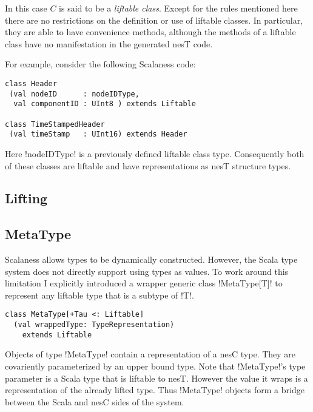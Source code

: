In this case $C$ is said to be a \textit{liftable class}. Except for the rules mentioned here
there are no restrictions on the definition or use of liftable classes. In particular, they are
able to have convenience methods, although the methods of a liftable class have no manifestation
in the generated nesT code.

For example, consider the following Scalaness code:

\singlespace
\begin{lstlisting}[language=scalaness]
class Header
 (val nodeID      : nodeIDType,
  val componentID : UInt8 ) extends Liftable

class TimeStampedHeader
 (val timeStamp   : UInt16) extends Header
\end{lstlisting}
\primaryspacing

Here !nodeIDType! is a previously defined liftable class type. Consequently both of these
classes are liftable and have representations as nesT structure types. 

\subsection{Lifting}
\label{section-lifting}


\subsection{MetaType}
\label{section-metatype}

Scalaness allows types to be dynamically constructed. However, the Scala type system does not
directly support using types as values. To work around this limitation I explicitly introduced a
wrapper generic class !MetaType[T]! to represent any liftable type that is a subtype of !T!.

\singlespace
\begin{lstlisting}[language=scalaness]
class MetaType[+Tau <: Liftable]
  (val wrappedType: TypeRepresentation)
    extends Liftable
\end{lstlisting}
\primaryspacing

Objects of type !MetaType! contain a representation of a nesC type. They are covariently
parameterized by an upper bound type. Note that !MetaType!'s type parameter is a Scala type that
is liftable to nesT. However the value it wraps is a representation of the already lifted type.
Thus !MetaType! objects form a bridge between the Scala and nesC sides of the system. 

